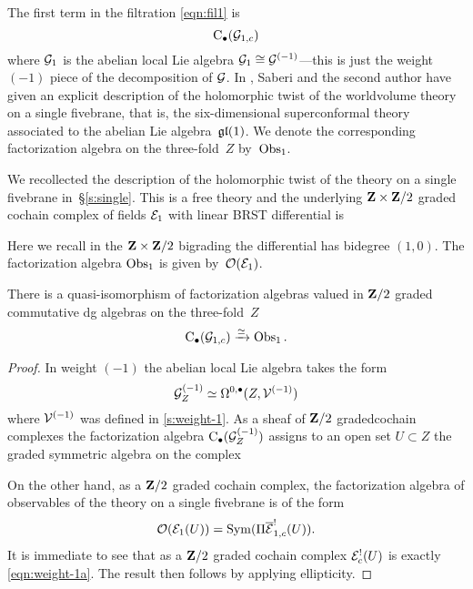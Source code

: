 The first term in the filtration \eqref{eqn:fil1} is 
\[
{\rm C}_\bullet(\mathcal G_{1,c})
\]
where $\mathcal G_1$ is the abelian local Lie algebra $\mathcal G_{1} \cong \mathcal G^{(-1)}$---this is just the weight $(-1)$ piece of the decomposition of $\mathcal G$. 
In \cite{SWtensor}, Saberi and the second author have given an explicit description of the holomorphic twist of the worldvolume theory on a single fivebrane, that is, the six-dimensional superconformal theory associated to the abelian Lie algebra~$\mathfrak{gl}(1)$.
We denote the corresponding factorization algebra on the three-fold~$Z$ by~$\operatorname{Obs}_1$.

We recollected the description of the holomorphic twist of the theory on a single fivebrane in~\S\ref{s:single}. 
This is a free theory and the underlying $\mathbf{Z} \times \mathbf{Z}/2$ graded cochain complex of fields $\mathcal E_{1}$ with linear BRST differential is
\beqn
{} 
\eeqn
Here we recall in the $\mathbf{Z} \times \mathbf{Z}/2$ bigrading the differential has bidegree $(1,0)$. 
The factorization algebra $\operatorname{Obs}_1$ is given by~$\mathcal O(\mathcal E_1)$.

\begin{prop}
\label{prop:factabelian}
There is a quasi-isomorphism of factorization algebras valued in $\mathbf{Z}/2$ graded commutative dg algebras on the three-fold~$Z$
\[
{\rm C}_\bullet(\mathcal G_{1,c}) \xrightarrow{\simeq} \operatorname{Obs}_{1} .
\]
\end{prop}

\begin{proof}
In weight $(-1)$ the abelian local Lie algebra takes the form
\[
\mathcal G_Z^{(-1)} \simeq \Omega^{0,\bullet}(Z,\mathcal V^{(-1)}) 
\]
where $\mathcal V^{(-1)}$ was defined in \ref{s:weight-1}.
As a sheaf of $\mathbf{Z}/2$ gradedcochain complexes the factorization algebra ${\rm C}_\bullet(\mathcal G_Z^{(-1)})$ assigns to an open set $U\subset Z$ the graded symmetric algebra on the complex
\beqn\label{eqn:weight-1a}
\eeqn
On the other hand, as a $\mathbf{Z}/2$ graded cochain complex, the factorization algebra of observables of the theory on a single fivebrane is of the form 
\[
\mathcal O(\mathcal E_{1}(U)) = \operatorname{Sym}(\Pi \overline{\mathcal E}_{1,c}^!(U)) .
\]
It is immediate to see that as a $\mathbf{Z}/2$ graded cochain complex $\mathcal E_c^!(U)$ is exactly \eqref{eqn:weight-1a}.
The result then follows by applying ellipticity.
\end{proof}

